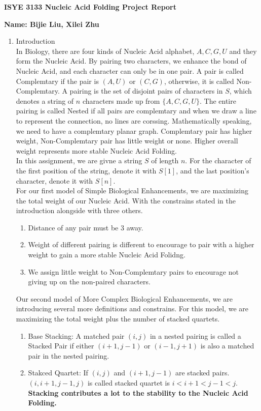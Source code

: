 \documentclass[11pt]{article}
\begin{document}
{\noindent\Large\textbf{ISYE 3133 Nucleic Acid Folding Project Report}}

\vspace{.25in}

{\large
\noindent
\textbf{Name: Bijie Liu, Xilei Zhu} \smallskip \\



\begin{enumerate}
\item  Introduction\\
In Biology, there are four kinds of Nucleic Acid alphabet, $A,C,G,U$ and they form the Nucleic Acid. By pairing two characters, we enhance the bond of Nucleic Acid, and each character can only be in one pair. A pair is called Complemtary if the pair is $(A,U)$ or $(C,G)$, otherwise, it is called Non-Complemtary. A pairing is the set of disjoint pairs of characters in $S$, which denotes a string of $n$ characters made up from $\{A,C,G,U\}$. The entire pairing is called Nested if all pairs are complemtary and when we draw a line to represent the connection, no lines are corssing. Mathematically speaking, we need to have a complemtary planar graph. Complemtary pair has higher weight, Non-Complemtary pair has little weight or none. Higher overall weight represents more stable Nucleic Acid Folding.\\

In this assignment, we are givne a string $S$ of length $n$. For the character of the first position of the string, denote it with $S[1]$, and the last position's character, denote it with $S[n]$.\\
For our first model of Simple Biological Enhancements, we are maximizing the total weight of our Nucleic Acid. With the constrains stated in the introduction alongside with three others. 
\begin{enumerate}
    \item Distance of any pair must be 3 away.
    \item Weight of different pairing is different to encourage to pair with a higher weight to gain a more stable Nucleic Acid Folidng.
    \item We assign little weight to Non-Complemtary pairs to encourage not giving up on the non-paired characters.
\end{enumerate}


Our second model of More Complex Biological Enhancements, we are introducing several more definitions and constrains. For this model, we are maximizing the total weight plus the number of stacked quartets.
\begin{enumerate}
    \item Base Stacking: A matched pair $(i,j)$ in a nested pairing is called a Stacked Pair if either $(i+1,j-1)$ or $(i-1,j+1)$ is also a matched pair in the nested pairing.
    \item Stakced Quartet: If $(i,j)$ and $(i+1,j-1)$ are stacked pairs. $(i,i+1,j-1,j)$ is called stacked quartet is $i<i+1<j-1<j$.\\
    \textbf{Stacking contributes a lot to the stability to the Nucleic Acid Folding.}


\end{enumerate}
\end{enumerate}}
\end{document}
